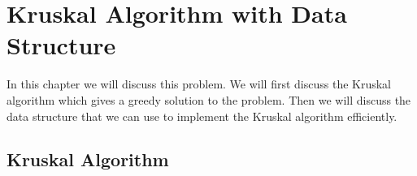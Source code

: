 \chapter{Kruskal Algorithm with Data Structure}
\begin{algoprob}
\end{algoprob}
In this chapter we will discuss this problem. We will first discuss the Kruskal algorithm which gives a greedy solution to the problem. Then we will discuss the data structure that we can use to implement the Kruskal algorithm efficiently.
\section{Kruskal Algorithm}
